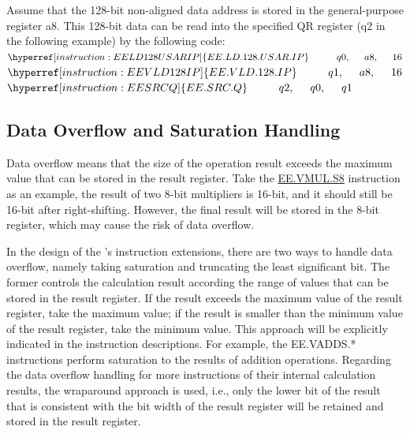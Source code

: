 \documentclass[main\_\_EN.tex]{subfiles}
\begin{document}
Assume that the 128-bit non-aligned data address is stored in the general-purpose register a8. This 128-bit data can be read into the specified QR register (q2 in the following example) by the following code:\\
$ \hyperref[instruction:EELD128USARIP]{EE.LD.128.USAR.IP}\hspace{1cm}q0,\hspace{0.5cm}a8,\hspace{0.5cm}16 $ \\
$ \hyperref[instruction:EEVLD128IP]{EE.VLD.128.IP}\hspace{1cm}q1,\hspace{0.5cm}a8,\hspace{0.5cm}16 $ \\
$ \hyperref[instruction:EESRCQ]{EE.SRC.Q}\hspace{1cm}q2,\hspace{0.5cm}q0,\hspace{0.5cm}q1 $

\subsection{Data Overflow and Saturation Handling}

Data overflow means that the size of the operation result exceeds the maximum value that can be stored in the result register. Take the \hyperref[instruction:EEVMULS8]{EE.VMUL.S8} instruction as an example, the result of two 8-bit multipliers is 16-bit, and it should still be 16-bit after right-shifting. However, the final result will be stored in the 8-bit register, which may cause the risk of data overflow.

In the design of the \chipname{}'s instruction extensions, there are two ways to handle data overflow, namely taking saturation and truncating the least significant bit. The former controls the calculation result according the range of values that can be stored in the result register. If the result exceeds the maximum value of the result register, take the maximum value; if the result is smaller than the minimum value of the result register, take the minimum value. This approach will be explicitly indicated in the instruction descriptions. For example, the EE.VADDS.* instructions perform saturation to the results of addition operations. Regarding the data overflow handling for more instructions of their internal calculation results, the wraparound approach is used, i.e., only the lower bit of the result that is consistent with the bit width of the result register will be retained and stored in the result register.
\end{document}
